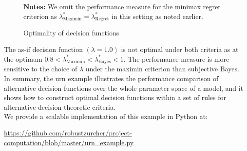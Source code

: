 \begin{figure}[h!]\centering
{}\vspace{-0.9cm}
\begin{center}
\begin{minipage}[t]{0.5\columnwidth}
\item \scriptsize{\textbf{Notes:} We omit the performance measure for the minimax regret criterion as $\lambda^*_{\text{Maximin}} = \lambda^*_{\text{Regret}}$ in this setting as noted earlier.}
\end{minipage}
\end{center}
\caption{Optimality of decision functions}\label{Optimality of decision functions for urn}
\end{figure}\FloatBarrier

The as-if decision function $(\lambda=1.0)$ is not optimal under both criteria as at the optimum  $0.8 < \lambda^*_{\text{Maximin}} < \lambda^*_{\text{Bayes}} < 1$. The performance measure is more sensitive to the choice of $\lambda$ under the maximin criterion than subjective Bayes.\\

In summary, the urn example illustrates the performance comparison of alternative decision functions over the whole parameter space of a model, and it shows how to construct optimal decision functions within a set of rules for alternative decision-theoretic criteria.\\

We provide a scalable implementation of this example in Python at:

\begin{center}
\href{https://github.com/robustzurcher/project-computation/blob/master/implementation.py}{https://github.com/robustzurcher/project-computation/blob/master/urn\_example.py}
\end{center}
